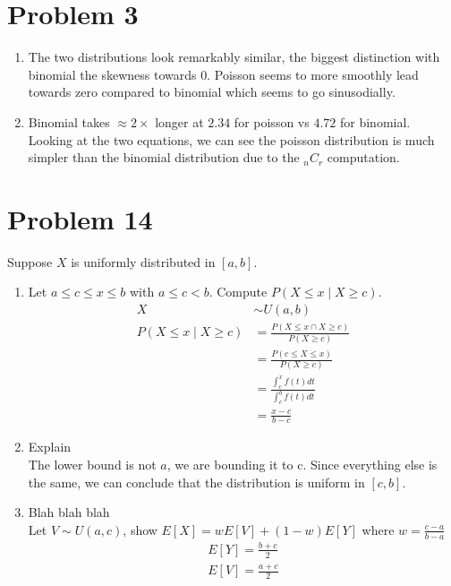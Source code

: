 \documentclass{article}
\begin{document}
\section*{Problem 3}
\begin{enumerate}[label=\alph*)]
    \item The two distributions look remarkably similar, the biggest distinction with binomial the skewness towards 0. Poisson seems to more smoothly lead towards zero compared to binomial which seems to go sinusodially.
    \item Binomial takes \(\approx 2 \times\) longer at \(2.34\) for poisson vs \(4.72\) for binomial.
          Looking at the two equations, we can see the poisson distribution is much simpler than the binomial distribution due to the \(_{n}C_r\) computation.
\end{enumerate}

\section*{Problem 14}
Suppose \(X\) is uniformly distributed in \([a, b]\).
\begin{enumerate}[label=\alph*)]
    \item Let \(a \leq c \leq x \leq b\) with \(a \leq c < b\). Compute \(P(X \leq x \mid X \geq c)\).
          \begin{align*}
              X                         & \sim U(a, b)                                    \\
              P(X \leq x \mid X \geq c) & = \frac{P(X \leq x \cap X \geq c)}{P(X \geq c)} \\
                                        & = \frac{P(c\leq X \leq x)}{P(X \geq c)}         \\
                                        & = \frac{\int_{c}^{x}f(t)dt}{\int_{c}^{b}f(t)dt} \\
                                        & = \frac{x - c}{b - c}
          \end{align*}
    \item Explain \\
          The lower bound is not \(a\), we are bounding it to c. Since everything else is the same, we can conclude that the distribution is uniform in \([c, b]\).
    \item Blah blah blah \\
          Let \(V \sim U(a, c)\), show \(E[X] = wE[V] + (1-w)E[Y]\) where \(w = \frac{c-a}{b-a}\)
          \begin{align*}
              E[Y] = \frac{b+c}{2} \\
              E[V] = \frac{a+c}{2} \\
          \end{align*}
\end{enumerate}
\end{document}

